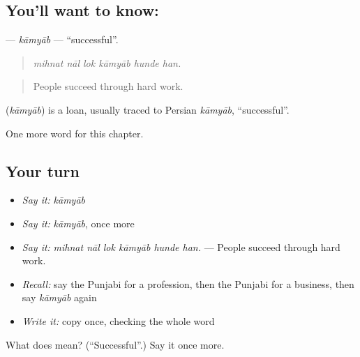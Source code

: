 \subsection*{You'll want to know: }
\textbf{} — \emph{kāmyāb} — \textquotedblleft{}successful\textquotedblright{}.

\begin{quote}
     
\end{quote}

\begin{quote}
\emph{mihnat nāl lok kāmyāb hunde han.}
\end{quote}

\begin{quote}
People succeed through hard work.
\end{quote}

\begin{cousinweb}
\textbf{} (\emph{kāmyāb}) is a loan, usually traced to Persian \emph{kāmyāb}, \textquotedblleft{}successful\textquotedblright{}.
\end{cousinweb}

\begin{grammarlens}[title={What you've built}]
One more word for this chapter.
\end{grammarlens}

\subsection*{Your turn}
\begin{itemize}
\raggedright
  \item \emph{Say it:} \emph{kāmyāb}
  \item \emph{Say it:} \emph{kāmyāb}, once more
  \item \emph{Say it:} \emph{mihnat nāl lok kāmyāb hunde han.} — People succeed through hard work.
  \item \emph{Recall:} say the Punjabi for a profession, then the Punjabi for a business, then say \emph{kāmyāb} again
  \item \emph{Write it:} copy \textbf{} once, checking the whole word
\end{itemize}

\begin{tcolorbox}[breakable,colback=teal!4,colframe=teal!35!black,title={Before you move on}]
What does  mean? (\textquotedblleft{}Successful\textquotedblright{}.) Say it once more.
\end{tcolorbox}
